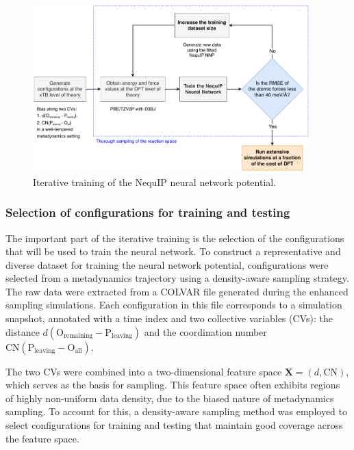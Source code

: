 \begin{figure}[t]
    \centering
    \includegraphics[width=0.95\textwidth]{Figures/3_Computational_details/workflow_diagram_updated.pdf}
    \caption{Iterative training of the NequIP neural network potential.}
    \label{fig:iterative-training}
\end{figure}



\subsubsection{Selection of configurations for training and testing}
The important part of the iterative training is the selection of the configurations that will be used to train the neural network. To construct a representative and diverse dataset for training the neural network potential, configurations were selected from a metadynamics trajectory using a density-aware sampling strategy. The raw data were extracted from a COLVAR file generated during the enhanced sampling simulations. Each configuration in this file corresponds to a simulation snapshot, annotated with a time index and two collective variables (CVs): the distance $d(\mathrm{O}_\text{remaining} - \mathrm{P}_\text{leaving})$ and the coordination number $\mathrm{CN}(\mathrm{P}_\text{leaving} - \mathrm{O}_\text{all})$.

The two CVs were combined into a two-dimensional feature space $\mathbf{X} = (d, \mathrm{CN})$, which serves as the basis for sampling. This feature space often exhibits regions of highly non-uniform data density, due to the biased nature of metadynamics sampling. To account for this, a density-aware sampling method was employed to select configurations for training and testing that maintain good coverage across the feature space.

